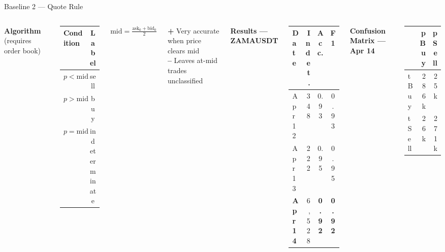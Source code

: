 \documentclass[aspectratio=169,10pt]{beamer}
\begin{document}
\begin{frame}{Baseline 2 — Quote Rule}
  \begin{columns}[T]
    \textbf{Algorithm} (requires order book)
    \begin{center}
    \begin{tabular}{lc}
      \toprule
      Condition & Label \\
      \midrule
      $p < \text{mid}$ & sell \\
      $p > \text{mid}$ & buy  \\
      $p = \text{mid}$ & indeterminate \\
      \bottomrule
    \end{tabular}
    \end{center}
    $\text{mid} = \frac{\text{ask}_0 + \text{bid}_0}{2}$

    \medskip
    \textcolor{okgreen}{\textbf{+}} Very accurate when price clears mid\\
    \textcolor{badred}{\textbf{--}} Leaves at-mid trades unclassified

    \textbf{Results — ZAMAUSDT}
    \begin{center}
    \begin{tabular}{lrcc}
      \toprule
      Date & Indet. & Acc. & F1 \\
      \midrule
      Apr 12 & 348   & 0.93 & 0.93 \\
      Apr 13 & 222   & 0.95 & 0.95 \\
      \textbf{Apr 14} & 6{,}528 & \textbf{0.92} & \textbf{0.92} \\
      \bottomrule
    \end{tabular}
    \end{center}
    \medskip
    \textbf{Confusion Matrix — Apr 14}
    \begin{center}
    \small
    \begin{tabular}{lrr}
      \toprule
       & pBuy & pSell \\
      \midrule
      tBuy  & 286k & 25k \\
      tSell & 26k  & 271k \\
      \bottomrule
    \end{tabular}
    \end{center}
  \end{columns}
\end{frame}
\end{document}
